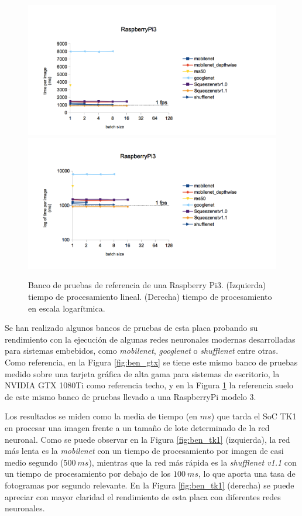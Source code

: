 \begin{figure}[htp]
    \centering
    \captionsetup{justification=centering}
    \includegraphics[width=.5\textwidth]{img/Raspi_linear.png}\hfill
    \includegraphics[width=.5\textwidth]{img/Raspi_log.png}
    \caption{Banco de pruebas de referencia de una Raspberry Pi3. (Izquierda) tiempo de procesamiento lineal. (Derecha) tiempo de procesamiento en escala logarítmica.}
    \label{fig:ben_pi}
\end{figure}

Se han realizado algunos bancos de pruebas de esta placa probando su rendimiento con la ejecución de algunas redes neuronales modernas desarrolladas para sistemas embebidos, como \textit{mobilenet}, \textit{googlenet} o \textit{shufflenet} entre otras. Como referencia, en la Figura \ref{fig:ben_gtx} se tiene este mismo banco de pruebas medido sobre una tarjeta gráfica de alta gama para sistemas de escritorio, la NVIDIA GTX 1080Ti como referencia techo, y en la Figura \ref{fig:ben_pi} la referencia suelo de este mismo banco de pruebas llevado a una RaspberryPi modelo 3.

Los resultados se miden como la media de tiempo (en $ms$) que tarda el SoC TK1 en procesar una imagen frente a un tamaño de lote determinado de la red neuronal. Como se puede observar en la Figura \ref{fig:ben_tk1} (izquierda), la red más lenta es la \textit{mobilenet} con un tiempo de procesamiento por imagen de casi medio segundo ($500\ ms$), mientras que la red más rápida es la \textit{shufflenet v1.1} con un tiempo de procesamiento por debajo de los $100\ ms$, lo que aporta una tasa de fotogramas por segundo relevante. En la Figura \ref{fig:ben_tk1} (derecha) se puede apreciar con mayor claridad el rendimiento de esta placa con diferentes redes neuronales.

